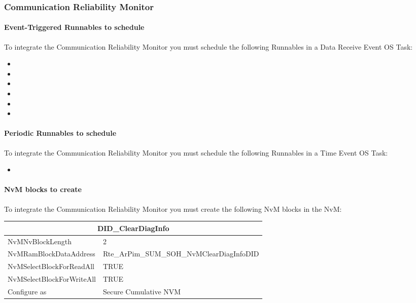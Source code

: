 \subsubsection{Communication Reliability Monitor}

\paragraph{Event-Triggered Runnables to schedule}
To integrate the Communication Reliability Monitor you must schedule the following Runnables in a Data Receive Event OS Task:

\begin{itemize}
    \item {}
    \item {}
    \item {}
    \item {}
    \item {}
    \item {}
\end{itemize}


\paragraph{Periodic Runnables to schedule}
To integrate the Communication Reliability Monitor you must schedule the following Runnables in a Time Event OS Task:

\begin{itemize}
    \item {}
\end{itemize}


\paragraph{NvM blocks to create}
To integrate the Communication Reliability Monitor you must create the following NvM blocks in the NvM:

\begin{tabular}{|l|p{8cm}|}\hline
\multicolumn{2}{|c|}{\textbf{DID\_ClearDiagInfo}}\\\hline
NvMNvBlockLength&2\\\hline
NvMRamBlockDataAddress&Rte\_ArPim\_SUM\_SOH\_NvMClearDiagInfoDID\\\hline
NvMSelectBlockForReadAll&TRUE\\\hline
NvMSelectBlockForWriteAll&TRUE\\\hline
Configure as&Secure Cumulative NVM\\\hline
\end{tabular}

